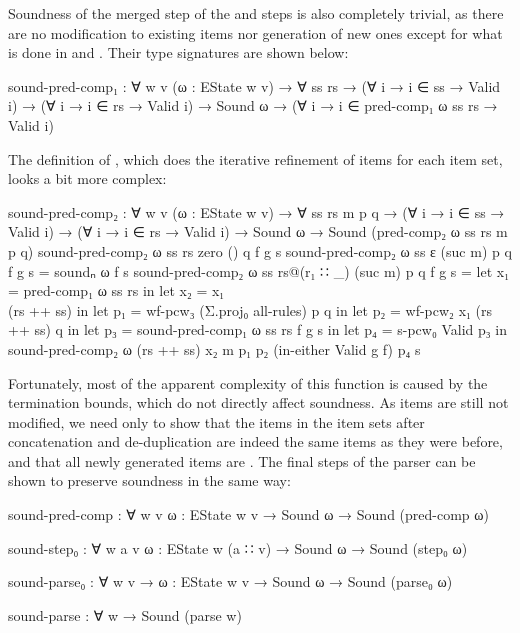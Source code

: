 		Soundness of the merged step  of the 
		and  steps is also completely trivial, as there are no
		modification to existing items nor generation of new ones except for
		what is done in  and . Their type
		signatures are shown below:

		\begin{code}
			sound-pred-comp₁ : ∀ {w v} (ω : EState w v) → ∀ ss rs →
			  (∀ {i} → i ∈ ss → Valid i) →
			  (∀ {i} → i ∈ rs → Valid i) →
			  Sound ω → (∀ {i} → i ∈ pred-comp₁ ω ss rs → Valid i)
		\end{code}

		The definition of , which does the iterative
		refinement of items for each item set, looks a bit more complex:

		\begin{code}
			sound-pred-comp₂ : ∀ {w v} (ω : EState w v) → ∀ ss rs m p q →
			  (∀ {i} → i ∈ ss → Valid i) →
			  (∀ {i} → i ∈ rs → Valid i) →
			  Sound ω → Sound (pred-comp₂ ω ss rs m p q)
			sound-pred-comp₂ ω ss rs zero () q f g s
			sound-pred-comp₂ ω ss ε (suc m) p q f g s = soundₙ ω f s
			sound-pred-comp₂ ω ss rs@(r₁ ∷ _) (suc m) p q f g s =
			  let x₁ = pred-comp₁ ω ss rs in
			  let x₂ = x₁ \\ (rs ++ ss) in
			  let p₁ = wf-pcw₃ (Σ.proj₀ all-rules) p q  in
			  let p₂ = wf-pcw₂ x₁ (rs ++ ss) q in
			  let p₃ = sound-pred-comp₁ ω ss rs f g s in
			  let p₄ = s-pcw₀ Valid p₃ in
			  sound-pred-comp₂ ω (rs ++ ss) x₂ m p₁ p₂ (in-either Valid g f) p₄ s
		\end{code}

		Fortunately, most of the apparent complexity of this function is caused
		by the termination bounds, which do not directly affect soundness. As
		items are still not modified, we need only to show that the items in
		the item sets after concatenation and de-duplication are indeed the
		same items as they were before, and that all newly generated items are
		. The final steps of the parser can be shown to preserve
		soundness in the same way:

		\begin{code}
			sound-pred-comp : ∀ {w v} {ω : EState w v} →
			  Sound ω → Sound (pred-comp ω)

			sound-step₀ : ∀ {w a v} {ω : EState w (a ∷ v)} →
			  Sound ω → Sound (step₀ ω)

			sound-parse₀ : ∀ {w v} → {ω : EState w v} →
			  Sound ω → Sound (parse₀ ω)

			sound-parse : ∀ w → Sound (parse w)
		\end{code}

